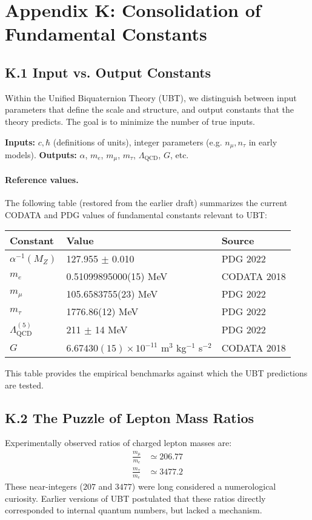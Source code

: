 
\appendix
\section*{Appendix K: Consolidation of Fundamental Constants}

\subsection*{K.1 Input vs. Output Constants}
Within the Unified Biquaternion Theory (UBT), we distinguish between input parameters that define the scale and structure, and output constants that the theory predicts. 
The goal is to minimize the number of true inputs.

\textbf{Inputs:} $c, \hbar$ (definitions of units), integer parameters (e.g. $n_\mu, n_\tau$ in early models).  
\textbf{Outputs:} $\alpha$, $m_e$, $m_\mu$, $m_\tau$, $\Lambda_{\text{QCD}}$, $G$, etc.

\paragraph{Reference values.}  
The following table (restored from the earlier draft) summarizes the current CODATA and PDG values of fundamental constants relevant to UBT:

\begin{center}
\begin{tabular}{lll}
\hline
Constant & Value & Source \\
\hline
$\alpha^{-1}(M_Z)$ & 127.955 $\pm$ 0.010 & PDG 2022 \\
$m_e$ & 0.51099895000(15) MeV & CODATA 2018 \\
$m_\mu$ & 105.6583755(23) MeV & PDG 2022 \\
$m_\tau$ & 1776.86(12) MeV & PDG 2022 \\
$\Lambda_{\text{QCD}}^{(5)}$ & 211 $\pm$ 14 MeV & PDG 2022 \\
$G$ & $6.67430(15)\times 10^{-11}$ m$^3$ kg$^{-1}$ s$^{-2}$ & CODATA 2018 \\
\hline
\end{tabular}
\end{center}

This table provides the empirical benchmarks against which the UBT predictions are tested.

\subsection*{K.2 The Puzzle of Lepton Mass Ratios}
Experimentally observed ratios of charged lepton masses are:
\begin{align*}
\frac{m_\mu}{m_e} &\simeq 206.77 \\
\frac{m_\tau}{m_e} &\simeq 3477.2
\end{align*}
These near-integers ($207$ and $3477$) were long considered a numerological curiosity.  
Earlier versions of UBT postulated that these ratios directly corresponded to internal quantum numbers, but lacked a mechanism.

